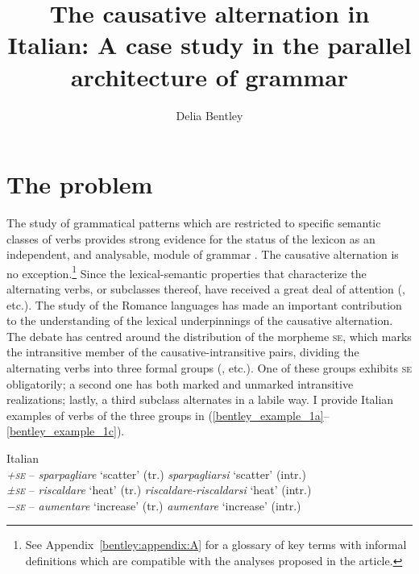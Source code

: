 \documentclass[output=paper,colorlinks,citecolor=brown
]{langscibook}
\author{Delia Bentley\orcid{}\affiliation{University of Manchester}}
\title[The causative alternation in Italian]{The causative alternation in Italian: A case study in the parallel architecture of grammar}
\begin{document}
\maketitle


\section{The problem}
\label{bentley_section_1}
\begin{sloppypar}
The study of grammatical patterns which are restricted to specific semantic classes of verbs provides strong evidence for the status of the lexicon as an independent, and analysable, module of grammar \citep{pinker1989learnability,pinker2013secret,levin1993english}. The causative alternation is no exception.\footnote{See Appendix~\ref{bentley:appendix:A} for a glossary of key terms with informal definitions which are compatible with the analyses proposed in the article.}  Since \citet[332–337]{jespersen1927modern} the lexical-semantic properties that characterize the alternating verbs, or subclasses thereof, have received a great deal of attention (\citealt{haspelmath1993more,levin1995unaccusativity,kiparsky1997remarks,chierchia1989semantics,comrie2006transitivity,schafer2009causative,samardzic2012meaning}, etc.). The study of the Romance languages has made an important contribution to the understanding of the lexical underpinnings of the causative alternation. The debate has centred around the distribution of the morpheme \textsc{se}, which marks the intransitive member of the causative-intransitive pairs, dividing the alternating verbs into three formal groups (\citealt{zribi1987reflexivite,labelle1992change,alexiadou2006properties, alexiadou2015external, legendre2010french,cennamo2011anticausative,cennamo2012aspectual,kailuweit2012construcciones,martin2014anticausatives,vivanco2021scalar}, etc.). One of these groups exhibits \textsc{se} obligatorily; a second one has both marked and unmarked intransitive realizations; lastly, a third subclass alternates in a labile way. I provide Italian examples of verbs of the three groups in (\ref{bentley_example_1a}--\ref{bentley_example_1c}).
\end{sloppypar}

\ea{}Italian\label{bentley_example_1}\\
\ea	\label{bentley_example_1a} \textit{\textsc{+\textsc{se}}} – \textit{sparpagliare} ‘scatter’ (tr.) \tab \textit{sparpagliarsi} ‘scatter’ (intr.) \\
\ex	\label{bentley_example_1b} \textit{\textsc{±\textsc{se}}} – \textit{riscaldare} ‘heat’ (tr.)      \tab \textit{riscaldare-riscaldarsi} ‘heat’ (intr.)  \\
\ex \label{bentley_example_1c} \textit{\textsc{−\textsc{se}}} – \textit{aumentare} ‘increase’ (tr.)   \tab \textit{aumentare} ‘increase’ (intr.)  \\
\z
\z
\end{document}
